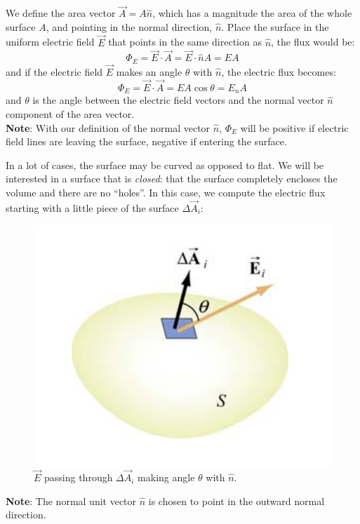 \documentclass[11pt, letterpaper]{article}
\begin{document}
	We define the area vector $\vec{A} = A\hat{n}$, which has a magnitude the area of the 
	whole surface $A$, and pointing in the normal direction, $\hat{n}$. Place the surface in
	the uniform electric field $\vec{E}$ that points in the same direction as $\hat{n}$, the 
	flux would be:\[\Phi_E = \vec{E}\cdot\vec{A} = \vec{E}\cdot\hat{n}A = EA\]
	and if the electric field $\vec{E}$ makes an angle $\theta$ with $\hat{n}$, the electric
	flux becomes:
	\begin{equation}
		\boxed{\Phi_E = \vec{E}\cdot\vec{A}=EA\cos\theta = E_nA}
	\end{equation}
	and $\theta$ is the angle between the electric field vectors and the normal vector $\hat{n}$
	component of the area vector.\\
	\textbf{Note}: With our definition of the normal vector $\hat{n}$, $\Phi_E$ will be positive
	if electric field lines are leaving the surface, negative if entering the surface.
	
	In a lot of cases, the surface may be curved as opposed to flat. We will be interested in a 
	surface that is \textit{closed}: that the surface completely encloses the volume and there
	are no ``holes''. In this case, we compute the electric flux starting with a little piece of the
	surface $\Delta\vec{A}_i$:
	\begin{figure}
		\centering
		\includegraphics[scale=0.6]{bean}
		\caption{$\vec{E}$ passing through $\Delta\vec{A}_i$ making angle $\theta$ with $\hat{n}$.}
	\end{figure}
	
	\textbf{Note}: The normal unit vector $\hat{n}$ is chosen to point in the outward normal
	direction. 
	
\end{document}
